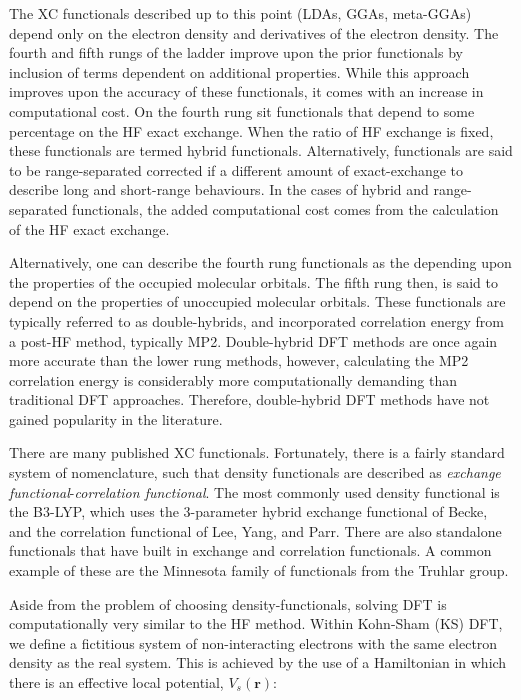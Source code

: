 The XC functionals described up to this point (LDAs, GGAs, meta-GGAs) depend
only on the electron density and derivatives of the electron density. The
fourth and fifth rungs of the ladder improve upon the prior functionals by
inclusion of terms dependent on additional properties. While this approach
improves upon the accuracy of these functionals, it comes with an increase in
computational cost. On the fourth rung sit functionals that depend to some
percentage on the HF exact exchange. When the ratio of HF exchange is fixed,
these functionals are termed hybrid functionals. Alternatively, functionals are
said to be range-separated corrected if a different amount of exact-exchange to
describe long and short-range behaviours. In the cases of hybrid and
range-separated functionals, the added computational cost comes from the
calculation of the HF exact exchange.

Alternatively, one can describe the fourth rung functionals as the depending
upon the properties of the occupied molecular orbitals. The fifth rung then, is
said to depend on the properties of unoccupied molecular orbitals. These
functionals are typically referred to as double-hybrids, and incorporated
correlation energy from a post-HF method, typically MP2.\cite{Goerigk2014}
Double-hybrid DFT methods are once again more accurate than the lower rung
methods, however, calculating the MP2 correlation energy is considerably more
computationally demanding than traditional DFT approaches. Therefore,
double-hybrid DFT methods have not gained popularity in the literature.

There are many published XC functionals. Fortunately, there is a fairly
standard system of nomenclature, such that density functionals are described as
\emph{exchange functional}-\emph{correlation functional}. The most commonly
used density functional is the  B3-LYP, which uses the 3-parameter hybrid
exchange functional of Becke,\cite{Becke1993} and the correlation functional of
Lee, Yang, and Parr.\cite{Lee1988} There are also standalone functionals that
have built in exchange and correlation functionals. A common example of these
are the Minnesota family of functionals from the Truhlar
group.\cite{Zhao2006,Zhao2006a}

Aside from the problem of choosing density-functionals, solving DFT is
computationally very similar to the HF method. Within Kohn-Sham (KS) DFT, we
define a fictitious system of non-interacting electrons with the same electron
density as the real system. This is achieved by the use of a Hamiltonian in
which there is an effective local potential, $V_s(\mathbf{r})$:

